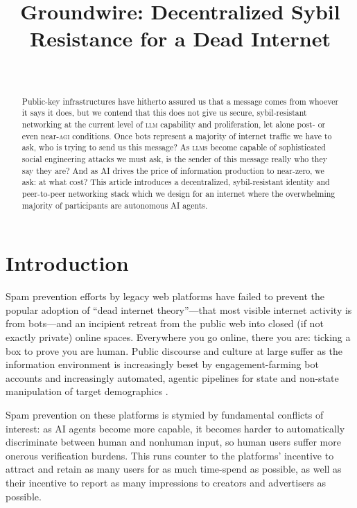 \documentclass[twoside]{article}
\title{Groundwire: Decentralized Sybil Resistance for a Dead Internet}
\author{\authorname \\ \affiliation}
\date{}
\begin{document}
\maketitle
\thispagestyle{firststyle}

\begin{abstract}
\sloppy
Public-key infrastructures have hitherto assured us that a message comes
from whoever it says it does, but we contend that this does not give us
secure, sybil-resistant networking at the current level of \textsc{llm}
capability and proliferation, let alone post- or even near-\textsc{agi}
conditions. Once bots represent a majority of internet traffic we have
to ask, who is trying to send us this message? As \textsc{llm}s become capable of
sophisticated social engineering attacks we must ask, is the sender of
this message really who they say they are? And as AI drives the price of
information production to near-zero, we ask: at what cost? This article
introduces a decentralized, sybil-resistant identity and peer-to-peer
networking stack which we design for an internet where the overwhelming
majority of participants are autonomous AI agents.
\end{abstract}

\setcounter{page}{87}

\tableofcontents

\section{Introduction}\label{introduction}

Spam prevention efforts by legacy web platforms have failed to prevent the popular adoption of ``dead internet theory''---that most visible
internet activity is from bots---and an incipient retreat from the
public web into closed (if not exactly private) online spaces.
Everywhere you go online, there you are: ticking a box to prove you are
human. Public discourse and culture at large suffer as the information
environment is increasingly beset by engagement-farming bot accounts
and increasingly automated, agentic pipelines for state and
non-state manipulation of target demographics \citep{Lumbaca2025}.

Spam prevention on these platforms is stymied by fundamental conflicts
of interest: as AI agents become more capable, it becomes harder to
automatically discriminate between human and nonhuman input, so human
users suffer more onerous verification burdens. This runs counter to the
platforms' incentive to attract and retain as many users for as much
time-spend as possible, as well as their incentive to report as many
impressions to creators and advertisers as possible.
\end{document}

